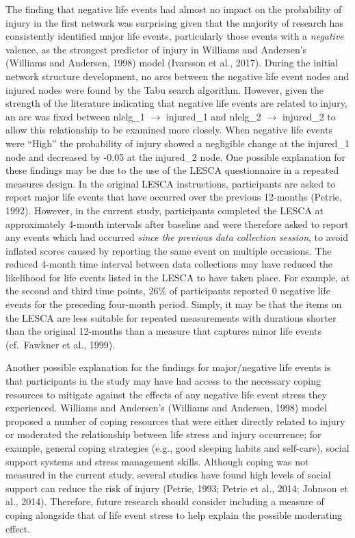 \documentclass[
]{frontiersHLTH}
\begin{document}
The finding that negative life events had almost no impact on the
probability of injury in the first network was surprising given that the
majority of research has consistently identified major life events,
particularly those events with a \emph{negative} valence, as the
strongest predictor of injury in Williams and Andersen's (Williams and
Andersen, 1998) model (Ivarsson et al., 2017). During the initial
network structure development, no arcs between the negative life event
nodes and injured nodes were found by the Tabu search algorithm.
However, given the strength of the literature indicating that negative
life events are related to injury, an arc was fixed between nlelg\_1
\(\rightarrow\) injured\_1 and nlelg\_2 \(\rightarrow\) injured\_2 to
allow this relationship to be examined more closely. When negative life
events were ``High'' the probability of injury showed a negligible
change at the injured\_1 node and decreased by -0.05 at the injured\_2
node. One possible explanation for these findings may be due to the use
of the LESCA questionnaire in a repeated measures design. In the
original LESCA instructions, participants are asked to report major life
events that have occurred over the previous 12-months (Petrie, 1992).
However, in the current study, participants completed the LESCA at
approximately 4-month intervals after baseline and were therefore asked
to report any events which had occurred \emph{since the previous data
collection session}, to avoid inflated scores caused by reporting the
same event on multiple occasions. The reduced 4-month time interval
between data collections may have reduced the likelihood for life events
listed in the LESCA to have taken place. For example, at the second and
third time points, 26\% of participants reported 0 negative life events
for the preceding four-month period. Simply, it may be that the items on
the LESCA are less suitable for repeated measurements with durations
shorter than the original 12-months than a measure that captures minor
life events (cf.~Fawkner et al., 1999).

Another possible explanation for the findings for major/negative life
events is that participants in the study may have had access to the
necessary coping resources to mitigate against the effects of any
negative life event stress they experienced. Williams and Andersen's
(Williams and Andersen, 1998) model proposed a number of coping
resources that were either directly related to injury or moderated the
relationship between life stress and injury occurrence; for example,
general coping strategies (e.g., good sleeping habits and self-care),
social support systems and stress management skills. Although coping was
not measured in the current study, several studies have found high
levels of social support can reduce the risk of injury (Petrie, 1993;
Petrie et al., 2014; Johnson et al., 2014). Therefore, future research
should consider including a measure of coping alongside that of life
event stress to help explain the possible moderating effect.
\end{document}
